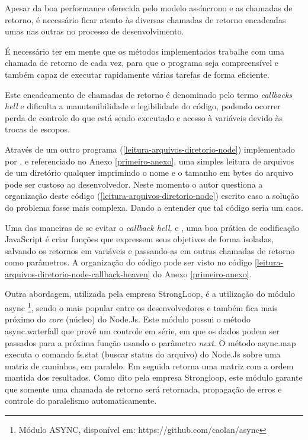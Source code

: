   
  Apesar da boa performance oferecida pelo modelo assíncrono e as chamadas de retorno, é necessário ficar
  atento às diversas chamadas de retorno encadeadas umas nas outras no processo de desenvolvimento. \cite{Pereira:2013} 
  
  É necessário ter em mente que os métodos implementados trabalhe com uma 
  chamada de retorno de cada vez, para que o programa seja compreensível e também capaz de executar rapidamente várias 
  tarefas de forma eficiente.\cite{Hughes:2012}
  
  Este encadeamento de chamadas de retorno é denominado pelo termo \textit{callbacks hell} e dificulta a manutenibilidade e 
  legibilidade do código, podendo ocorrer perda de controle do que está sendo executado e acesso à variáveis devido às
  trocas de escopos. \cite{Pereira:2013}
  
  Através de um outro programa (\ref{leitura-arquivos-diretorio-node}) implementado por , e referenciado no 
  Anexo \ref{primeiro-anexo}, uma simples leitura de arquivos de um diretório qualquer imprimindo o nome e o tamanho em bytes do arquivo 
  pode ser custoso ao desenvolvedor. Neste momento o autor questiona a organização deste código (\ref{leitura-arquivos-diretorio-node}) escrito caso a solução do 
  problema fosse mais complexa. Dando a entender que tal código seria um caos.
  
  
  Uma das maneiras de se evitar o \textit{callback hell}, e , uma boa prática de codificação JavaScript é
  criar funções que expressem seus objetivos de forma isoladas, salvando os retornos em variáveis e passando-as em outras
  chamadas de retorno como parâmetros. A organização do código pode ser visto no código \ref{leitura-arquivos-diretorio-node-callback-heaven} do
  Anexo \ref{primeiro-anexo}.\cite{Pereira:2013}
 
  Outra abordagem, utilizada pela empresa StrongLoop, é a utilização do módulo async \footnote{Módulo ASYNC, disponível em: https://github.com/caolan/async},
  sendo o mais popular entre os desenvolvedores e também fica mais próximo do \textit{core} (núcleo) do Node.Js. Este módulo
  possui o método async.waterfall que provê um controle em série, em que os dados podem ser passados para a próxima função
  usando o parâmetro \textit{next}. O método async.map executa o comando fs.stat (buscar status do arquivo) do Node.Js sobre uma matriz
  de caminhos, em paralelo. Em seguida retorna uma matriz com a ordem mantida dos resultados. Como dito pela empresa
  Strongloop, este módulo garante que somente uma chamada de retorno será retornada, propagação de erros e controle do 
  paralelismo automaticamente. 
  
